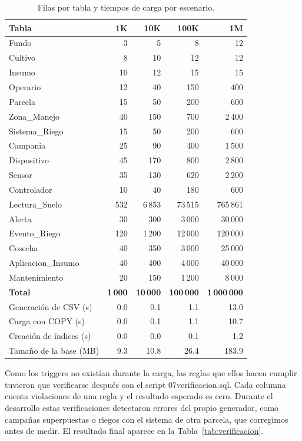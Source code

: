 \documentclass[11pt,letterpaper]{article}
\newcommand{\tbus}{\textunderscore\allowbreak}
\newcommand{\tb}[1]{{\ttfamily\let\_\tbus #1}}
\begin{document}
\begin{table}[H]
\centering\small
\begin{tabular}{lrrrr}
\toprule
Tabla & 1K & 10K & 100K & 1M \\
\midrule
Fundo & 3 & 5 & 8 & 12 \\
Cultivo & 8 & 10 & 12 & 12 \\
Insumo & 10 & 12 & 15 & 15 \\
Operario & 12 & 40 & 150 & 400 \\
Parcela & 15 & 50 & 200 & 600 \\
Zona\_Manejo & 40 & 150 & 700 & 2\,400 \\
Sistema\_Riego & 15 & 50 & 200 & 600 \\
Campania & 25 & 90 & 400 & 1\,500 \\
Dispositivo & 45 & 170 & 800 & 2\,800 \\
Sensor & 35 & 130 & 620 & 2\,200 \\
Controlador & 10 & 40 & 180 & 600 \\
Lectura\_Suelo & 532 & 6\,853 & 73\,515 & 765\,861 \\
Alerta & 30 & 300 & 3\,000 & 30\,000 \\
Evento\_Riego & 120 & 1\,200 & 12\,000 & 120\,000 \\
Cosecha & 40 & 350 & 3\,000 & 25\,000 \\
Aplicacion\_Insumo & 40 & 400 & 4\,000 & 40\,000 \\
Mantenimiento & 20 & 150 & 1\,200 & 8\,000 \\
\textbf{Total} & \textbf{1\,000} & \textbf{10\,000} & \textbf{100\,000} & \textbf{1\,000\,000} \\
\midrule Generación de CSV (s) & 0.0 & 0.1 & 1.1 & 13.0 \\
Carga con COPY (s) & 0.0 & 0.1 & 1.1 & 10.7 \\
Creación de índices (s) & 0.0 & 0.0 & 0.1 & 1.2 \\
Tamaño de la base (MB) & 9.3 & 10.8 & 26.4 & 183.9 \\
\bottomrule
\end{tabular}
\caption{Filas por tabla y tiempos de carga por escenario.}\label{tab:carga}
\end{table}


Como los triggers no existían durante la carga, las reglas que ellos hacen cumplir tuvieron que verificarse después con el script \tb{07\_verificacion.sql}. Cada columna cuenta violaciones de una regla y el resultado esperado es cero. Durante el desarrollo estas verificaciones detectaron errores del propio generador, como campañas superpuestas o riegos con el sistema de otra parcela, que corregimos antes de medir. El resultado final aparece en la Tabla~\ref{tab:verificacion}.
\end{document}
